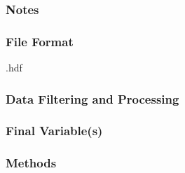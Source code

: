 \subsubsection*{Notes}

\subsubsection*{File Format} .hdf

\subsubsection*{Data Filtering and Processing}

\subsubsection*{Final Variable(s)}

\subsubsection*{Methods}

